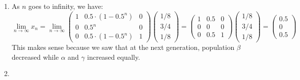 \documentclass[11pt, legalpaper]{article}
\begin{document}
\begin{enumerate}
    \item As $n$ goes to infinity, we have:
    $$\lim_{n\to \infty}x_n=\lim_{n\to \infty}\begin{pmatrix}
        1 & 0.5\cdot(1-0.5^n) & 0 \\
        0 & 0.5^n & 0 \\
        0 & 0.5\cdot(1-0.5^n) & 1
    \end{pmatrix}\begin{pmatrix} 1/8 \\ 3/4 \\ 1/8 \end{pmatrix}=\begin{pmatrix} 1 & 0.5 & 0 \\
        0 & 0& 0 \\
        0 & 0.5 & 1\end{pmatrix}\begin{pmatrix} 1/8 \\ 3/4 \\ 1/8 \end{pmatrix}=\begin{pmatrix} 0.5 \\ 0 \\ 0.5 \end{pmatrix}$$
    This makes sense because we saw that at the next generation, population $\beta$ decreased while $\alpha$ and $\gamma$ increased equally.
    
    \item 
\end{enumerate}
\end{document}
